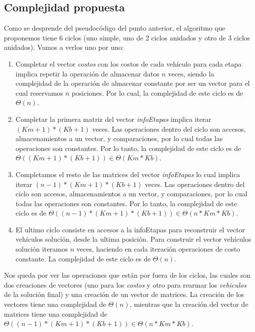 \subsection{Complejidad propuesta}

Como se desprende del pseudocódigo del punto anterior, el algoritmo que proponemos tiene 6 ciclos (uno simple, uno de 2 ciclos anidados y otro de 3 ciclos anidados). Vamos a verlos uno por uno:

\begin{enumerate}
	\item Completar el vector \textit{costos} con los costos de cada vehículo para cada etapa implica repetir la operación de almacenar datos $n$ veces, siendo la complejidad de la operación de almacenar constante por ser un vector para el cual reservamos $n$ posiciones. Por lo cual, la complejidad de este ciclo es de $\Theta(n)$.
    \item  Completar la primera matriz del vector \textit{infoEtapas} implica iterar $(Km+1)*(Kb+1)$ veces. Las operaciones dentro del ciclo son accesos, almacenamientos a un vector, y comparaciones, por lo cual todas las operaciones son constantes. Por lo tanto, la complejidad de este ciclo es de $\Theta((Km+1)*(Kb+1)) \in \Theta(Km*Kb)$.
     \item  Completamos el resto de las matrices del vector \textit{infoEtapas} lo cual implica iterar $(n-1)*(Km+1)*(Kb+1)$ veces. Las operaciones dentro del ciclo son accesos, almacenamientos a un vector, y comparaciones, por lo cual todas las operaciones son constantes. Por lo tanto, la complejidad de este ciclo es de $\Theta((n-1)*(Km+1)*(Kb+1)) \in \Theta(n*Km*Kb)$.
     \item El ultimo ciclo consiste en accesos a la infoEtapas para reconstruir el vector vehículos solución, desde la ultima posición. Para construir el vector vehículos solución iteramos $n$ veces, haciendo en cada iteración operaciones de costo constante. La complejidad de este ciclo es de $\Theta(n)$.

\end{enumerate}

Nos queda por ver las operaciones que están por fuera de los ciclos, las cuales son dos creaciones de vectores (uno para los \textit{costos} y otro para rearmar los \textit{vehiculos} de la solución final) y una creación de un vector de matrices. La creación de los vectores tiene una complejidad de $\Theta(n)$, mientras que la creación del vector de matrices tiene una complejidad de $\Theta((n-1)*(Km+1)*(Kb+1)) \in \Theta(n*Km*Kb)$.

